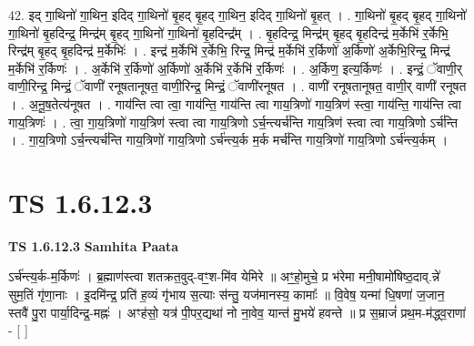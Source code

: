 \documentclass[17pt]{extarticle}
\begin{document}
42. इद् गा॒थिनो॑ गा॒थिन॒ इदिद् गा॒थिनो॑ बृ॒हद् बृ॒हद् गा॒थिन॒ इदिद् गा॒थिनो॑ बृ॒हत् । . गा॒थिनो॑ बृ॒हद् बृ॒हद् गा॒थिनो॑ गा॒थिनो॑ बृ॒हदिन्द्र॒ मिन्द्र॑म् बृ॒हद् गा॒थिनो॑ गा॒थिनो॑ बृ॒हदिन्द्र᳚म् । . बृ॒हदिन्द्र॒ मिन्द्र॑म् बृ॒हद् बृ॒हदिन्द्र॑ म॒र्केभि॑ र॒र्केभि॒ रिन्द्र॑म् बृ॒हद् बृ॒हदिन्द्र॑ म॒र्केभिः॑ । . इन्द्र॑ म॒र्केभि॑ र॒र्केभि॒ रिन्द्र॒ मिन्द्र॑ म॒र्केभि॑ र॒र्किणो॑ अ॒र्किणो॑ अ॒र्केभि॒रिन्द्र॒ मिन्द्र॑ म॒र्केभि॑ र॒र्किणः॑ । . अ॒र्केभि॑ र॒र्किणो॑ अ॒र्किणो॑ अ॒र्केभि॑ र॒र्केभि॑ र॒र्किणः॑ । . अ॒र्किण॒ इत्य॒र्किणः॑ । . इन्द्रं॒ ॅवाणी॒र् वाणी॒रिन्द्र॒ मिन्द्रं॒ ॅवाणी॑ रनूषतानूषत॒ वाणी॒रिन्द्र॒ मिन्द्रं॒ ॅवाणी॑रनूषत । . वाणी॑ रनूषतानूषत॒ वाणी॒र् वाणी॑ रनूषत । . अ॒नू॒ष॒तेत्य॑नूषत । . गाय॑न्ति त्वा त्वा॒ गाय॑न्ति॒ गाय॑न्ति त्वा गाय॒त्रिणो॑ गाय॒त्रिण॑ स्त्वा॒ गाय॑न्ति॒ गाय॑न्ति त्वा गाय॒त्रिणः॑ । . त्वा॒ गा॒य॒त्रिणो॑ गाय॒त्रिण॑ स्त्वा त्वा गाय॒त्रिणो ऽर्च॒न्त्यर्च॑न्ति गाय॒त्रिण॑ स्त्वा त्वा गाय॒त्रिणो ऽर्च॑न्ति । . गा॒य॒त्रिणो ऽर्च॒न्त्यर्च॑न्ति गाय॒त्रिणो॑ गाय॒त्रिणो ऽर्च॑न्त्य॒र्क म॒र्क मर्च॑न्ति गाय॒त्रिणो॑ गाय॒त्रिणो ऽर्च॑न्त्य॒र्कम् । \newline
\pagebreak
{}
\section*{ TS 1.6.12.3 }

\textbf{TS 1.6.12.3 } \newline
\textbf{Samhita Paata} \newline

ऽर्च॑न्त्य॒र्क-म॒र्किणः॑ । ब्र॒ह्माण॑स्त्वा शतक्रत॒वुद्-वꣳ॒॒श-मि॑व येमिरे ॥ अꣳ॒॒हो॒मुचे॒ प्र भ॑रेमा मनी॒षामो॑षिष्ठ॒दाव्.न्ने॑ सुम॒तिं गृ॑णा॒नाः । इ॒दमि॑न्द्र॒ प्रति॑ ह॒व्यं गृ॑भाय स॒त्याः स॑न्तु॒ यज॑मानस्य॒ कामाः᳚ ॥ वि॒वेष॒ यन्मा॑ धि॒षणा॑ ज॒जान॒ स्तवै॑ पु॒रा पार्या॒दिन्द्र॒-मह्नः॑ । अꣳह॑सो॒ यत्र॑ पी॒पर॒द्यथा॑ नो ना॒वेव॒ यान्त॑ मु॒भये॑ हवन्ते ॥ प्र स॒म्राजं॑ प्रथ॒म-म॑द्ध्व॒राणा॑ - [ ] \newline
\end{document}
